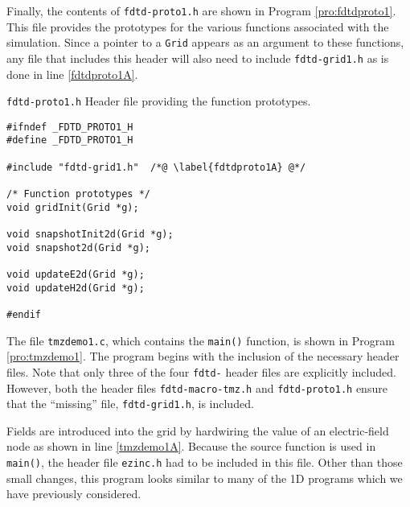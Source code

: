 Finally, the contents of {\tt fdtd-proto1.h} are shown in Program
\ref{pro:fdtdproto1}.  This file provides the prototypes for the
various functions associated with the simulation.  Since a pointer to
a {\tt Grid} appears as an argument to these functions, any file that
includes this header will also need to include {\tt fdtd-grid1.h} as
is done in line \ref{fdtdproto1A}.

\begin{program}
{\tt fdtd-proto1.h} Header file providing the function prototypes.
\label{pro:fdtdproto1}
\codemiddle
\begin{lstlisting}
#ifndef _FDTD_PROTO1_H
#define _FDTD_PROTO1_H

#include "fdtd-grid1.h"  /*@ \label{fdtdproto1A} @*/

/* Function prototypes */
void gridInit(Grid *g);

void snapshotInit2d(Grid *g);
void snapshot2d(Grid *g);

void updateE2d(Grid *g);
void updateH2d(Grid *g);

#endif
\end{lstlisting}
\end{program}

The file {\tt tmzdemo1.c}, which contains the {\tt main()} function,
is shown in Program \ref{pro:tmzdemo1}.  The program begins with the
inclusion of the necessary header files.  Note that only three of the
four {\tt fdtd-} header files are explicitly included.  However, both
the header files {\tt fdtd-macro-tmz.h} and {\tt fdtd-proto1.h} ensure
that the ``missing'' file, {\tt fdtd-grid1.h}, is included.

Fields are introduced into the grid by hardwiring the value of an
electric-field node as shown in line \ref{tmzdemo1A}.  Because the
source function is used in {\tt main()}, the header file {\tt ezinc.h}
had to be included in this file.  Other than those small changes, this
program looks similar to many of the 1D programs which we have
previously considered.

